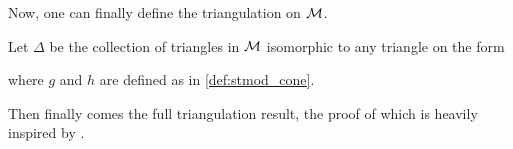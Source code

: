Now, one can finally define the triangulation on \( {\mathcal{M}} \).

\begin{definition}
    Let \( \Delta \) be the collection of triangles in \( {\mathcal{M}} \) isomorphic to any triangle on the form
    \begin{center}
    \end{center}
    where \( g \) and \( h \) are defined as in \autoref{def:stmod_cone}.
\end{definition}


Then finally comes the full triangulation result, the proof of which is heavily inspired by \cite[First theorem in Chapter 1, Subsection 2.6]{Happel_1988}.


